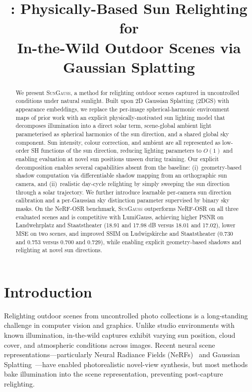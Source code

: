 \documentclass[conference]{IEEEtran}
\title{\ours{}: Physically-Based Sun Relighting for\\In-the-Wild Outdoor Scenes via Gaussian Splatting}
\author{
    \IEEEauthorblockN{Alp Bora Orgun, Marco Volino, Adrian Hilton, Jean-Yves Guillemaut}
    \IEEEauthorblockA{CVSSP, University of Surrey\\
    \texttt{ao00821@surrey.ac.uk, m.volino@surrey.ac.uk, a.hilton@surrey.ac.uk, j.guillemaut@surrey.ac.uk}}
}
\newcommand{\ours}{\textsc{SunGauss}}
\begin{document}
\maketitle

\begin{abstract}
    We present \ours{}, a method for relighting outdoor scenes captured in uncontrolled conditions under natural sunlight.
    Built upon 2D Gaussian Splatting (2DGS) with appearance embeddings, we replace the per-image spherical-harmonic environment maps of prior work with an explicit physically-motivated sun lighting model that decomposes illumination into a direct solar term, scene-global ambient light parameterised as spherical harmonics of the sun direction, and a shared global sky component.
    Sun intensity, colour correction, and ambient are all represented as low-order SH functions of the sun direction, reducing lighting parameters to $O(1)$ and enabling evaluation at novel sun positions unseen during training.
    Our explicit decomposition enables several capabilities absent from the baseline:
    (i)~geometry-based shadow computation via differentiable shadow mapping from an orthographic sun camera,
    and (ii)~realistic day-cycle relighting by simply sweeping the sun direction through a solar trajectory.
    We further introduce learnable per-camera sun direction calibration and a per-Gaussian sky distinction parameter supervised by binary sky masks.
    On the NeRF-OSR benchmark, \ours{} outperforms NeRF-OSR on all three evaluated scenes and is competitive with LumiGauss, achieving higher PSNR on Landwehrplatz and Staatstheater (18.91 and 17.98 dB versus 18.01 and 17.02), lower MSE on two scenes, and improved SSIM on Ludwigskirche and Staatstheater (0.730 and 0.753 versus 0.700 and 0.729), while enabling explicit geometry-based shadows and relighting at novel sun directions.
\end{abstract}

\section{Introduction}
\label{sec:intro}

Relighting outdoor scenes from uncontrolled photo collections is a long-standing challenge in computer vision and graphics.
Unlike studio environments with known illumination, in-the-wild captures exhibit varying sun position, cloud cover, and atmospheric conditions across images.
Recent neural scene representations---particularly Neural Radiance Fields (NeRFs)~\cite{mildenhall2020nerf} and Gaussian Splatting~\cite{kerbl20233dgs}---have enabled photorealistic novel-view synthesis, but most methods bake illumination into the scene representation, preventing post-capture relighting.
\end{document}

